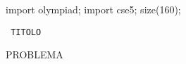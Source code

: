 \documentclass[legalpaper]{article}
\begin{document}
\begin{asydef}
    import olympiad;
    import cse5;
    size(160);
\end{asydef}

\pagestyle{empty}
\Huge

\begin{center}       %
	{  \fontsize{35pt}{20}\selectfont \texttt{
		{{TITOLO}}	 }}
\end{center}
\bigskip\bigskip	 %

{{PROBLEMA}}
\end{document}
